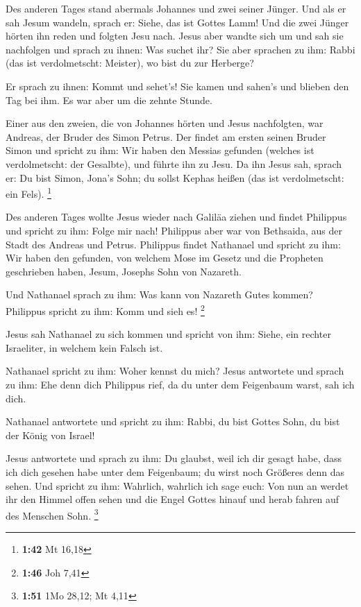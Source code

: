  Des anderen Tages stand abermals Johannes und zwei
seiner Jünger.  Und als er sah Jesum wandeln, sprach er:
Siehe, das ist Gottes Lamm!  Und die zwei Jünger hörten
ihn reden und folgten Jesu nach.  Jesus aber wandte sich
um und sah sie nachfolgen und sprach zu ihnen: Was suchet ihr? Sie aber
sprachen zu ihm: Rabbi (das ist verdolmetscht: Meister), wo bist du zur
Herberge?

 Er sprach zu ihnen: Kommt und sehet's! Sie kamen und
sahen's und blieben den Tag bei ihm. Es war aber um die zehnte Stunde.

 Einer aus den zweien, die von Johannes hörten und Jesus
nachfolgten, war Andreas, der Bruder des Simon Petrus. 
Der findet am ersten seinen Bruder Simon und spricht zu ihm: Wir haben
den Messias gefunden (welches ist verdolmetscht: der Gesalbte),
 und führte ihn zu Jesu. Da ihn Jesus sah, sprach er: Du
bist Simon, Jona's Sohn; du sollst Kephas heißen (das ist verdolmetscht:
ein Fels). \footnote{\textbf{1:42} Mt 16,18}

 Des anderen Tages wollte Jesus wieder nach Galiläa
ziehen und findet Philippus und spricht zu ihm: Folge mir nach!
 Philippus aber war von Bethsaida, aus der Stadt des
Andreas und Petrus.  Philippus findet Nathanael und
spricht zu ihm: Wir haben den gefunden, von welchem Mose im Gesetz und
die Propheten geschrieben haben, Jesum, Josephs Sohn von Nazareth.

 Und Nathanael sprach zu ihm: Was kann von Nazareth Gutes
kommen? Philippus spricht zu ihm: Komm und sieh es! \footnote{\textbf{1:46}
  Joh 7,41}

 Jesus sah Nathanael zu sich kommen und spricht von ihm:
Siehe, ein rechter Israeliter, in welchem kein Falsch ist.

 Nathanael spricht zu ihm: Woher kennst du mich? Jesus
antwortete und sprach zu ihm: Ehe denn dich Philippus rief, da du unter
dem Feigenbaum warst, sah ich dich.

 Nathanael antwortete und spricht zu ihm: Rabbi, du bist
Gottes Sohn, du bist der König von Israel!

 Jesus antwortete und sprach zu ihm: Du glaubst, weil ich
dir gesagt habe, dass ich dich gesehen habe unter dem Feigenbaum; du
wirst noch Größeres denn das sehen.  Und spricht zu ihm:
Wahrlich, wahrlich ich sage euch: Von nun an werdet ihr den Himmel offen
sehen und die Engel Gottes hinauf und herab fahren auf des Menschen
Sohn. \footnote{\textbf{1:51} 1Mo 28,12; Mt 4,11}

